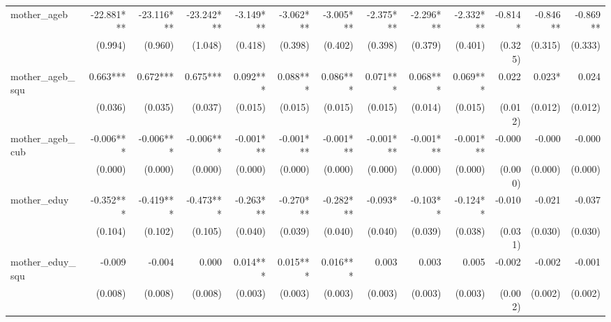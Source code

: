 \begin{tabular}{lrrrrrrrrrrrr}
mother\_ageb                                &   -22.881*** &   -23.116*** &   -23.242*** &    -3.149*** &    -3.062*** &    -3.005*** &    -2.375*** &    -2.296*** &    -2.332*** &      -0.814* &     -0.846** &     -0.869** \\ 
                                            &      (0.994) &      (0.960) &      (1.048) &      (0.418) &      (0.398) &      (0.402) &      (0.398) &      (0.379) &      (0.401) &      (0.325) &      (0.315) &      (0.333) \\ 
mother\_ageb\_squ                           &     0.663*** &     0.672*** &     0.675*** &     0.092*** &     0.088*** &     0.086*** &     0.071*** &     0.068*** &     0.069*** &        0.022 &       0.023* &        0.024 \\ 
                                            &      (0.036) &      (0.035) &      (0.037) &      (0.015) &      (0.015) &      (0.015) &      (0.015) &      (0.014) &      (0.015) &      (0.012) &      (0.012) &      (0.012) \\ 
mother\_ageb\_cub                           &    -0.006*** &    -0.006*** &    -0.006*** &    -0.001*** &    -0.001*** &    -0.001*** &    -0.001*** &    -0.001*** &    -0.001*** &       -0.000 &       -0.000 &       -0.000 \\ 
                                            &      (0.000) &      (0.000) &      (0.000) &      (0.000) &      (0.000) &      (0.000) &      (0.000) &      (0.000) &      (0.000) &      (0.000) &      (0.000) &      (0.000) \\ 
mother\_eduy                                &    -0.352*** &    -0.419*** &    -0.473*** &    -0.263*** &    -0.270*** &    -0.282*** &      -0.093* &     -0.103** &     -0.124** &       -0.010 &       -0.021 &       -0.037 \\ 
                                            &      (0.104) &      (0.102) &      (0.105) &      (0.040) &      (0.039) &      (0.040) &      (0.040) &      (0.039) &      (0.038) &      (0.031) &      (0.030) &      (0.030) \\ 
mother\_eduy\_squ                           &       -0.009 &       -0.004 &        0.000 &     0.014*** &     0.015*** &     0.016*** &        0.003 &        0.003 &        0.005 &       -0.002 &       -0.002 &       -0.001 \\ 
                                            &      (0.008) &      (0.008) &      (0.008) &      (0.003) &      (0.003) &      (0.003) &      (0.003) &      (0.003) &      (0.003) &      (0.002) &      (0.002) &      (0.002) \\ 

\end{tabular}
